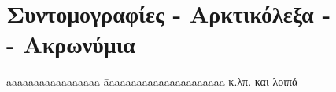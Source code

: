 \newcommand{\abbrevEN}[2]{\en{#1} \> \en{#2}\\ }
\newcommand{\abbrevGR}[2]{#1 \> #2\\ }

\chapter*{Συντομογραφίες - Αρκτικόλεξα - \\ - Ακρωνύμια}

\begin{tabbing}
  aaaaaaaaaaaaaaaaa \= aaaaaaaaaaaaaaaaaaaaaa\kill
  \abbrevGR{κ.λπ.}{και λοιπά}
\end{tabbing}